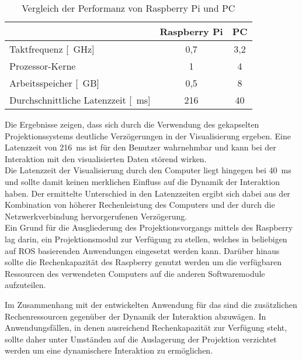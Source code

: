 \begin{table}[ht]
\caption{Vergleich der Performanz von Raspberry Pi und PC}
\begin{center}
\begin{tabular}{|l|c|c|}
\hline
\rowcolor{lightgray} & \multicolumn{1}{|c|}{\textbf{Raspberry Pi}} & \multicolumn{1}{|c|}{\textbf{PC}}\\
\hline
Taktfrequenz [\SI{}{\GHz}] & 0,7 & 3,2 \\
\hline
Prozessor-Kerne & 1 & 4\\
\hline
Arbeitsspeicher [\SI{}{GB}] & 0,5 & 8\\
\hline
Durchschnittliche Latenzzeit [\SI{}{\milli\second}] & 216 & 40 \\
\hline
\end{tabular}
\end{center}
\label{tab.latency}
\end{table}


Die Ergebnisse zeigen, dass sich durch die Verwendung des gekapselten Projektionssystems deutliche Verzögerungen in der Visualisierung ergeben. Eine Latenzzeit von \SI{216}{\milli\second} ist für den Benutzer wahrnehmbar und kann bei der Interaktion mit den visualisierten Daten störend wirken.\\
Die Latenzzeit der Visualisierung durch den Computer liegt hingegen bei \SI{40}{\milli\second} und sollte damit keinen merklichen Einfluss auf die Dynamik der Interaktion haben. Der ermittelte Unterschied in den Latenzzeiten ergibt sich dabei aus der Kombination von höherer Rechenleistung des Computers und der  durch die Netzwerkverbindung hervorgerufenen Verzögerung.\\

Ein Grund für die Ausgliederung des Projektionsvorgangs mittels des Raspberry lag darin, ein Projektionsmodul zur Verfügung zu stellen, welches in beliebigen auf ROS basierenden Anwendungen eingesetzt werden kann. Darüber hinaus sollte die Rechenkapazität des Raspberry genutzt werden um die verfügbaren Ressourcen des verwendeten Computers auf die anderen Softwaremodule aufzuteilen.\\

\prever{
}

Im Zusammenhang mit der entwickelten Anwendung für das \kps{} sind die zusätzlichen Rechenressourcen gegenüber der Dynamik der Interaktion abzuwägen. In Anwendungsfällen, in denen ausreichend Rechenkapazität zur Verfügung steht, sollte daher unter Umständen auf die Auslagerung der Projektion verzichtet werden um eine dynamischere Interaktion zu ermöglichen.